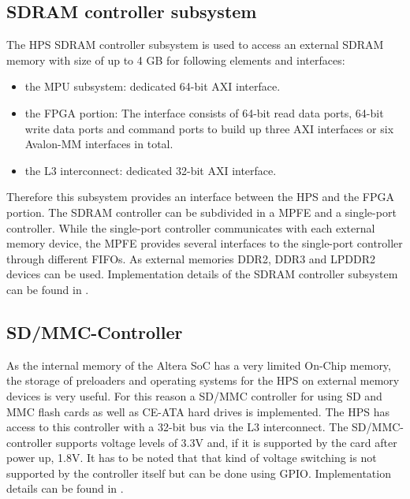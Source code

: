 \subsection{SDRAM controller subsystem}
The HPS SDRAM controller subsystem is used to access an external SDRAM memory with size of up to 4 GB for following elements and interfaces:
\begin{itemize}
\item the MPU subsystem: dedicated 64-bit AXI interface.
\item the FPGA portion: The interface consists of 64-bit read data ports, 64-bit write data ports and command ports to build up three AXI interfaces or six Avalon-MM interfaces in total.
\item the L3 interconnect: dedicated 32-bit AXI interface.
\end{itemize}
Therefore this subsystem provides an interface between the HPS and the FPGA portion. The SDRAM controller can be subdivided in a MPFE and a single-port controller. While the single-port controller communicates with each external memory device, the MPFE provides several interfaces to the single-port controller through different FIFOs. As external memories DDR2, DDR3 and LPDDR2 devices can be used. Implementation details of the SDRAM controller subsystem can be found in \cite[chapter 11]{AlteraHPS15}.
\subsection{SD/MMC-Controller}
As the internal memory of the Altera SoC has a very limited On-Chip memory, the storage of preloaders and operating systems for the HPS on external memory devices is very useful. For this reason a SD/MMC controller for using SD and MMC flash cards as well as CE-ATA hard drives is implemented. The HPS has access to this controller with a 32-bit bus via the L3 interconnect. The SD/MMC-controller supports voltage levels of 3.3V and, if it is supported by the card after power up, 1.8V. It has to be noted that that kind of voltage switching is not supported by the controller itself but can be done using GPIO. Implementation details can be found in \cite[chapter 14]{AlteraHPS15}.
